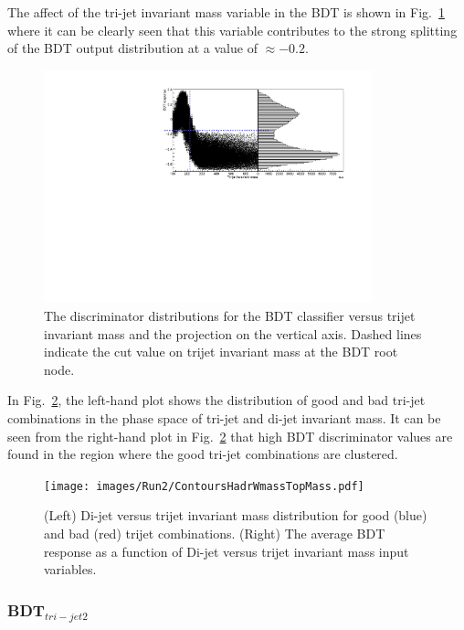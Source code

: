 The affect of the tri-jet invariant mass variable in the BDT is shown in Fig.~\ref{fig:multimode13} where it can be clearly seen that this variable contributes to the strong splitting of the BDT output distribution at a value of $\approx-0.2$.

\begin{figure}[ht!]
\begin{center}
    \includegraphics[width=0.85\textwidth]{images/Run2/multimode.pdf}
    \caption{The discriminator distributions for the BDT classifier versus trijet invariant mass and the projection on the vertical axis. Dashed lines indicate the cut value on trijet invariant mass at the BDT root node.}
    \label{fig:multimode13}
\end{center}
\end{figure}

In Fig.~\ref{fig:ContoursTopMassHadrWmass13}, the left-hand plot shows the distribution of good and bad tri-jet combinations in the phase space of tri-jet and di-jet invariant mass. It can be seen from the right-hand plot in Fig.~\ref{fig:ContoursTopMassHadrWmass13} that high BDT discriminator values are found in the region where the good tri-jet combinations are clustered.
\begin{figure}[ht!]
\begin{center}
    \texttt{[image: images/Run2/ContoursHadrWmassTopMass.pdf]}
    \caption{(Left)  Di-jet versus trijet invariant mass distribution for good (blue) and bad (red) trijet combinations. (Right) The average BDT response as a function of Di-jet versus trijet invariant mass input variables.}
    \label{fig:ContoursTopMassHadrWmass13}
\end{center}
\end{figure}

\subsubsection*{BDT$_{tri-jet2}$}

